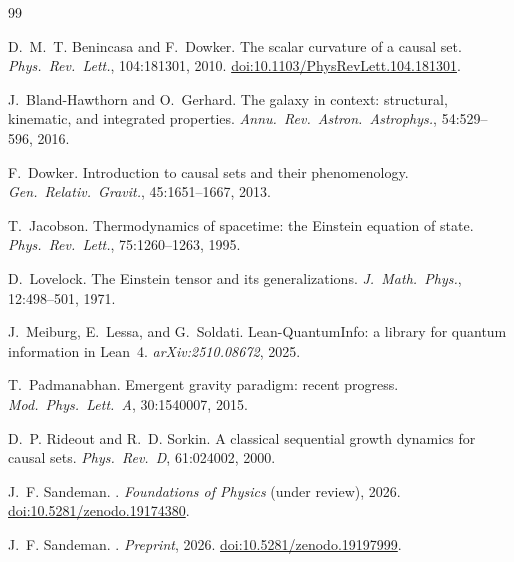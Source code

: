 \documentclass[11pt,a4paper]{article}
\begin{document}
\begin{thebibliography}{99}

D.~M.~T. Benincasa and F.~Dowker.
\newblock The scalar curvature of a causal set.
\newblock \textit{Phys.\ Rev.\ Lett.}, 104:181301, 2010.
\newblock \href{https://doi.org/10.1103/PhysRevLett.104.181301}{doi:10.1103/PhysRevLett.104.181301}.

J.~Bland-Hawthorn and O.~Gerhard.
\newblock The galaxy in context: structural, kinematic, and integrated properties.
\newblock \textit{Annu.\ Rev.\ Astron.\ Astrophys.}, 54:529--596, 2016.

F.~Dowker.
\newblock Introduction to causal sets and their phenomenology.
\newblock \textit{Gen.\ Relativ.\ Gravit.}, 45:1651--1667, 2013.

T.~Jacobson.
\newblock Thermodynamics of spacetime: the Einstein equation of state.
\newblock \textit{Phys.\ Rev.\ Lett.}, 75:1260--1263, 1995.

D.~Lovelock.
\newblock The Einstein tensor and its generalizations.
\newblock \textit{J.\ Math.\ Phys.}, 12:498--501, 1971.

J.~Meiburg, E.~Lessa, and G.~Soldati.
\newblock Lean-QuantumInfo: a library for quantum information in Lean~4.
\newblock \textit{arXiv:2510.08672}, 2025.

T.~Padmanabhan.
\newblock Emergent gravity paradigm: recent progress.
\newblock \textit{Mod.\ Phys.\ Lett.~A}, 30:1540007, 2015.

D.~P. Rideout and R.~D. Sorkin.
\newblock A classical sequential growth dynamics for causal sets.
\newblock \textit{Phys.\ Rev.~D}, 61:024002, 2000.

J.~F. Sandeman.
.
\newblock \textit{Foundations of Physics} (under review), 2026.
\newblock \href{https://doi.org/10.5281/zenodo.19174380}{doi:10.5281/zenodo.19174380}.

J.~F. Sandeman.
.
\newblock \textit{Preprint}, 2026.
\newblock \href{https://doi.org/10.5281/zenodo.19197999}{doi:10.5281/zenodo.19197999}.


\end{thebibliography}
\end{document}
